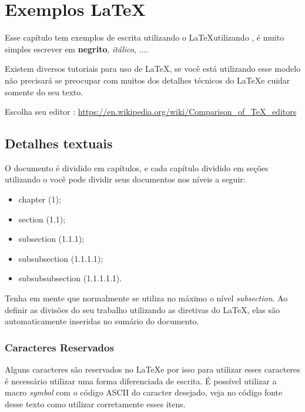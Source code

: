 \chapter{Exemplos \LaTeX}



Esse capítulo tem exemplos de escrita utilizando o \LaTeX  utilizando \abnTeX, é muito simples escrever em \textbf{negrito}, \emph{itálico}, ....


Existem diversos tutoriais para uso de \LaTeX, se você está utilizando esse modelo não precisará se preocupar com muitos dos detalhes técnicos do \LaTeX \space e cuidar somente do seu texto.

Escolha seu editor : \url{https://en.wikipedia.org/wiki/Comparison\_of\_TeX\_editors}




\section{Detalhes textuais}

O documento é dividido em capítulos, e cada capítulo dividido em seções utilizando o \abnTeX \space você pode dividir seus documentos nos níveis a seguir:

\begin{itemize}
\item chapter (1);
\item section (1.1);
\item subsection (1.1.1);
\item subsubsection (1.1.1.1);
\item subsubsubsection (1.1.1.1.1).
\end{itemize}

Tenha em mente que normalmente se utiliza no máximo o nível \emph{subsection}.
Ao definir as divisões do seu trabalho utilizando as diretivas do \LaTeX, elas são automaticamente inseridas no sumário do documento.


\subsection{Caracteres Reservados}



Alguns caracteres são reservados no \LaTeX \space e por isso para utilizar esses caracteres é necessário utilizar uma forma diferenciada de escrita. É possível utilizar a macro \emph{symbol} com o código ASCII do caracter desejado, veja no código fonte desse texto como utilizar corretamente esses itens.


